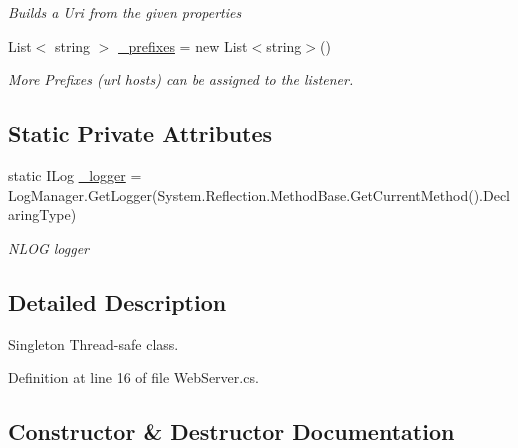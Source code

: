 \begin{DoxyCompactItemize}
\begin{DoxyCompactList}\small\item\em Builds a Uri from the given properties \end{DoxyCompactList}\item 
List$<$ string $>$ \mbox{\hyperlink{class_concord_1_1_c3_http_module_1_1_web_server_a621c105d864049d0ff6cda39e1cc9dc6}{\+\_\+prefixes}} = new List$<$string$>$()
\begin{DoxyCompactList}\small\item\em More Prefixes (url hosts) can be assigned to the listener. \end{DoxyCompactList}\end{DoxyCompactItemize}
\subsection*{Static Private Attributes}
\begin{DoxyCompactItemize}
\item 
static I\+Log \mbox{\hyperlink{class_concord_1_1_c3_http_module_1_1_web_server_a95e1f65ea64f11e550fd2a8fd41614e3}{\+\_\+logger}} = Log\+Manager.\+Get\+Logger(System.\+Reflection.\+Method\+Base.\+Get\+Current\+Method().Declaring\+Type)
\begin{DoxyCompactList}\small\item\em N\+L\+OG logger \end{DoxyCompactList}\end{DoxyCompactItemize}


\subsection{Detailed Description}
Singleton Thread-\/safe class. 



Definition at line 16 of file Web\+Server.\+cs.



\subsection{Constructor \& Destructor Documentation}
\mbox{\label{class_concord_1_1_c3_http_module_1_1_web_server_a1f9e775ee54aa91662039d7f1a549193}} 

